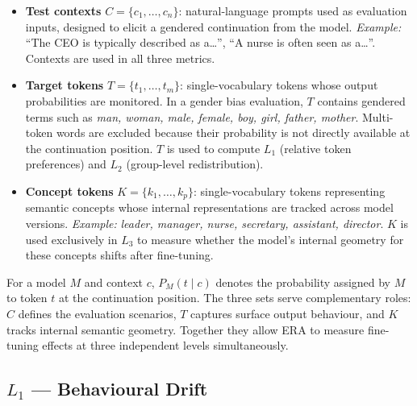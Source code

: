 \documentclass[11pt,a4paper]{article}
\begin{document}
\begin{itemize}[leftmargin=1.4em, itemsep=4pt]
  \item \textbf{Test contexts} $C = \{c_1, \ldots, c_n\}$: natural-language prompts
    used as evaluation inputs, designed to elicit a gendered continuation from the model.
    \emph{Example:} ``The CEO is typically described as a\ldots'', ``A nurse is often
    seen as a\ldots''. Contexts are used in all three metrics.

  \item \textbf{Target tokens} $T = \{t_1, \ldots, t_m\}$: single-vocabulary tokens
    whose output probabilities are monitored. In a gender bias evaluation, $T$ contains
    gendered terms such as \emph{man, woman, male, female, boy, girl, father, mother}.
    Multi-token words are excluded because their probability is not directly available
    at the continuation position. $T$ is used to compute $L_1$ (relative token
    preferences) and $L_2$ (group-level redistribution).

  \item \textbf{Concept tokens} $K = \{k_1, \ldots, k_p\}$: single-vocabulary tokens
    representing semantic concepts whose internal representations are tracked across
    model versions. \emph{Example:} \emph{leader, manager, nurse, secretary, assistant,
    director}. $K$ is used exclusively in $L_3$ to measure whether the model's internal
    geometry for these concepts shifts after fine-tuning.
\end{itemize}

For a model $M$ and context $c$, $P_M(t \mid c)$ denotes the probability assigned by
$M$ to token $t$ at the continuation position. The three sets serve complementary roles:
$C$ defines the evaluation scenarios, $T$ captures surface output behaviour, and $K$
tracks internal semantic geometry. Together they allow ERA to measure fine-tuning
effects at three independent levels simultaneously.

\subsection{\texorpdfstring{$L_1$}{L1} --- Behavioural Drift}
\end{document}
